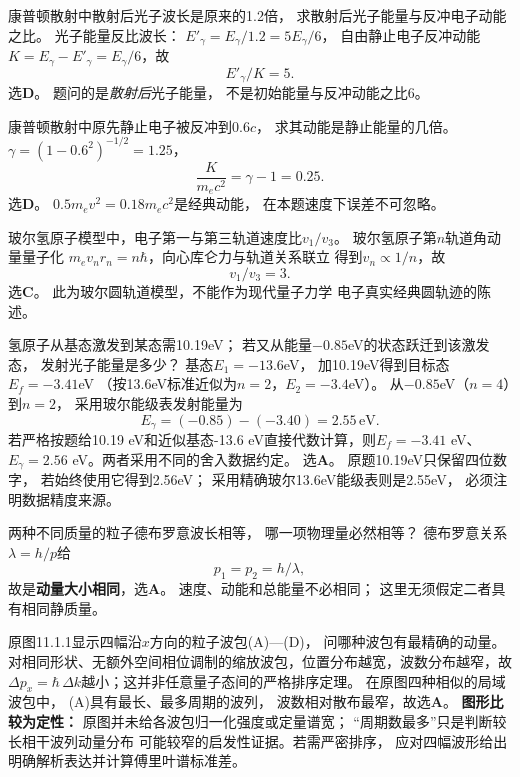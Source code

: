 \problemtext 康普顿散射中散射后光子波长是原来的1.2倍，
求散射后光子能量与反冲电子动能之比。
\workings
光子能量反比波长：
$E'_\gamma=E_\gamma/1.2=5E_\gamma/6$，
自由静止电子反冲动能
$K=E_\gamma-E'_\gamma=E_\gamma/6$，故
\[
\boxed{E'_\gamma/K=5}.
\]
选\textbf{D}。
\crosscheck 题问的是\emph{散射后}光子能量，
不是初始能量与反冲动能之比6。

\problemtext 康普顿散射中原先静止电子被反冲到$0.6c$，
求其动能是静止能量的几倍。
\workings
$\gamma=(1-0.6^2)^{-1/2}=1.25$，
\[
\boxed{\frac{K}{m_ec^2}=\gamma-1=0.25}.
\]
选\textbf{D}。
\crosscheck $0.5m_ev^2=0.18m_ec^2$是经典动能，
在本题速度下误差不可忽略。

\problemtext 玻尔氢原子模型中，电子第一与第三轨道速度比$v_1/v_3$。
\workings
玻尔氢原子第$n$轨道角动量量子化
$m_ev_nr_n=n\hbar$，向心库仑力与轨道关系联立
得到$v_n\propto1/n$，故
\[
\boxed{v_1/v_3=3}.
\]
选\textbf{C}。
\crosscheck 此为玻尔圆轨道模型，不能作为现代量子力学
电子真实经典圆轨迹的陈述。

\problemtext 氢原子从基态激发到某态需10.19eV；
若又从能量$-0.85$eV的状态跃迁到该激发态，
发射光子能量是多少？
\workings
基态$E_1=-13.6$eV，
加10.19eV得到目标态$E_f=-3.41$eV
（按13.6eV标准近似为$n=2$，$E_2=-3.4$eV）。
从$-0.85$eV（$n=4$）到$n=2$，
采用玻尔能级表发射能量为
\[
\boxed{E_\gamma=(-0.85)-(-3.40)=2.55\,\mathrm{eV}}.
\]
若严格按题给10.19 eV和近似基态-13.6 eV直接代数计算，则$E_f=-3.41$ eV、$E_\gamma=2.56$ eV。两者采用不同的舍入数据约定。
选\textbf{A}。
\crosscheck 原题10.19eV只保留四位数字，
若始终使用它得到2.56eV；
采用精确玻尔13.6eV能级表则是2.55eV，
必须注明数据精度来源。

\problemtext 两种不同质量的粒子德布罗意波长相等，
哪一项物理量必然相等？
\workings
德布罗意关系
$\lambda=h/p$给
\[
\boxed{p_1=p_2=h/\lambda},
\]
故是\textbf{动量大小相同}，选\textbf{A}。
\crosscheck 速度、动能和总能量不必相同；
这里无须假定二者具有相同静质量。

\problemtext 原图11.1.1显示四幅沿$x$方向的粒子波包(A)—(D)，
问哪种波包有最精确的动量。
\workings
对相同形状、无额外空间相位调制的缩放波包，位置分布越宽，波数分布越窄，故$\Delta p_x=\hbar\,\Delta k$越小；这并非任意量子态间的严格排序定理。
在原图四种相似的局域波包中，
(A)具有最长、最多周期的波列，
波数相对散布最窄，故选\textbf{A}。
\crosscheck \textbf{图形比较为定性：}
原图并未给各波包归一化强度或定量谱宽；
“周期数最多”只是判断较长相干波列动量分布
可能较窄的启发性证据。若需严密排序，
应对四幅波形给出明确解析表达并计算傅里叶谱标准差。

